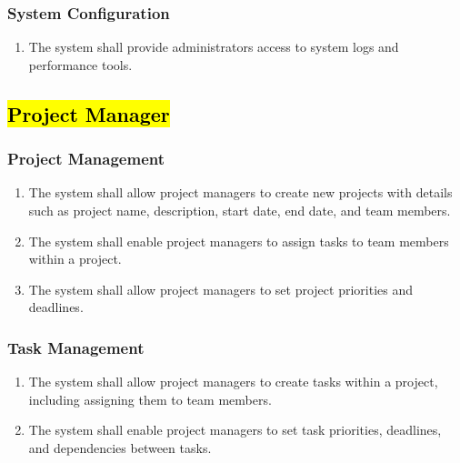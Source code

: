 \documentclass[]{article}
\begin{document}
            \subsubsection{System Configuration}
            \begin{enumerate}[label=\scriptsize\textbf{\textcolor{gray}{FR-ADM-\arabic{adminCounter}}}, leftmargin=*, itemsep=-4px]
                \item The system shall provide administrators access to system logs and performance tools.
            \end{enumerate}

        \subsection{\hl{Project Manager}}
            \subsubsection{Project Management}
            \begin{enumerate}[label=\scriptsize\textbf{\textcolor{gray}{FR-PM-\arabic{pmCounter}}}, leftmargin=*, itemsep=-4px]
               \item The system shall allow project managers to create new projects with details such as project name, description, start date, end date, and team members.
               \item The system shall enable project managers to assign tasks to team members within a project.
               \item The system shall allow project managers to set project priorities and deadlines.
            \end{enumerate}

            \subsubsection{Task Management}
            \begin{enumerate}[label=\scriptsize\textbf{\textcolor{gray}{FR-PM-\arabic{pmCounter}}}, leftmargin=*, itemsep=-4px]
               \item The system shall allow project managers to create tasks within a project, including assigning them to team members.
               \item The system shall enable project managers to set task priorities, deadlines, and dependencies between tasks.
            \end{enumerate}
\end{document}
